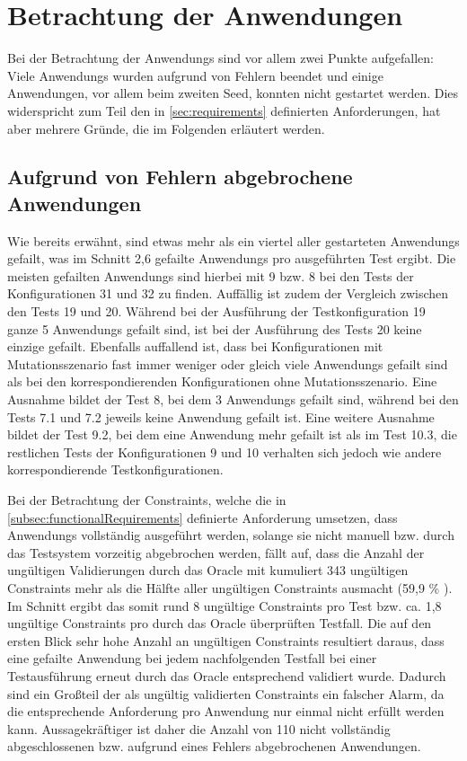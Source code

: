 \section{Betrachtung der Anwendungen}
\label{sec:appEval}

Bei der Betrachtung der \glspl{Anwendung} sind vor allem zwei Punkte aufgefallen:
Viele \glspl{Anwendung} wurden aufgrund von Fehlern beendet und einige Anwendungen, vor allem beim zweiten Seed, konnten nicht gestartet werden.
Dies widerspricht zum Teil den in \cref{sec:requirements} definierten Anforderungen, hat aber mehrere Gründe, die im Folgenden erläutert werden.

\subsection{Aufgrund von Fehlern abgebrochene Anwendungen}
\label{subsec:failedApps}

Wie bereits erwähnt, sind etwas mehr als ein viertel aller gestarteten \glspl{Anwendung} gefailt, was im Schnitt 2,6 gefailte \glspl{Anwendung} pro ausgeführten \gls{Test} ergibt.
Die meisten gefailten \glspl{Anwendung} sind hierbei mit 9 bzw. 8 bei den \glspl{Test} der Konfigurationen 31 und 32 zu finden.
Auffällig ist zudem der Vergleich zwischen den \glspl{Test} 19 und 20.
Während bei der Ausführung der \gls{Testkonfiguration} 19 ganze 5 \glspl{Anwendung} gefailt sind, ist bei der Ausführung des \glspl{Test} 20 keine einzige gefailt.
Ebenfalls auffallend ist, dass bei Konfigurationen mit Mutationsszenario fast immer weniger oder gleich viele \glspl{Anwendung} gefailt sind als bei den korrespondierenden Konfigurationen ohne Mutationsszenario.
Eine Ausnahme bildet der \gls{Test} 8, bei dem 3 \glspl{Anwendung} gefailt sind, während bei den \glspl{Test} 7.1 und 7.2 jeweils keine \gls{Anwendung} gefailt ist.
Eine weitere Ausnahme bildet der \gls{Test} 9.2, bei dem eine \gls{Anwendung} mehr gefailt ist als im \gls{Test} 10.3, die restlichen \glspl{Test} der Konfigurationen 9 und 10 verhalten sich jedoch wie andere korrespondierende Testkonfigurationen.

Bei der Betrachtung der Constraints, welche die in \cref{subsec:functionalRequirements} definierte Anforderung umsetzen, dass \glspl{Anwendung} vollständig ausgeführt werden, solange sie nicht manuell bzw. durch das Testsystem vorzeitig abgebrochen werden, fällt auf, dass die Anzahl der ungültigen Validierungen durch das Oracle mit kumuliert 343 ungültigen Constraints mehr als die Hälfte aller ungültigen Constraints ausmacht (59,9 \% ).
Im Schnitt ergibt das somit rund 8 ungültige Constraints pro \gls{Test} bzw. ca. 1,8 ungültige Constraints pro durch das Oracle überprüften Testfall.
Die auf den ersten Blick sehr hohe Anzahl an ungültigen Constraints resultiert daraus, dass eine gefailte \gls{Anwendung} bei jedem nachfolgenden \gls{Testfall} bei einer Testausführung erneut durch das Oracle entsprechend validiert wurde.
Dadurch sind ein Großteil der als ungültig validierten Constraints ein falscher Alarm, da die entsprechende Anforderung pro \gls{Anwendung} nur einmal nicht erfüllt werden kann.
Aussagekräftiger ist daher die Anzahl von 110 nicht vollständig abgeschlossenen bzw. aufgrund eines Fehlers abgebrochenen Anwendungen.

